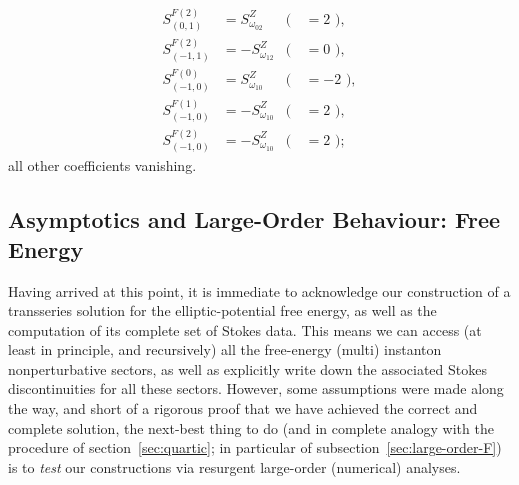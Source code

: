 \documentclass[11pt,a4paper]{article}
\begin{document}
%
\begin{align}
\label{ell-stokes-freeen-2-1}
S^{F(2)}_{(0,1)} &= S_{\omega_{02}}^Z &(\, &= 2\,\, ), \\
\label{ell-stokes-freeen-2-2}
S^{F(2)}_{(-1,1)} &= -S_{\omega_{12}}^Z &(\, &= 0\,\, ), \\
\label{ell-stokes-freeen-2-3}
S^{F(0)}_{(-1,0)} &= S_{\omega_{10}}^Z &(\, &= - 2\,\, ), \\
\label{ell-stokes-freeen-2-4}
S^{F(1)}_{(-1,0)} &= - S_{\omega_{10}}^Z &(\, &= 2\,\, ), \\
\label{ell-stokes-freeen-2-5}
S^{F(2)}_{(-1,0)} &= - S_{\omega_{10}}^Z &(\, &= 2\,\, );
\end{align}
%
\noindent
all other coefficients vanishing.

\subsection{Asymptotics and Large-Order Behaviour: Free Energy}\label{sec:large-order-nonres}

Having arrived at this point, it is immediate to acknowledge our construction of a transseries solution for the elliptic-potential free energy, as well as the computation of its complete set of Stokes data. This means we can access (at least in principle, and recursively) all the free-energy (multi) instanton nonperturbative sectors, as well as explicitly write down the associated Stokes discontinuities for all these sectors. However, some assumptions were made along the way, and short of a rigorous proof that we have achieved the correct and complete solution, the next-best thing to do (and in complete analogy with the procedure of section~\ref{sec:quartic}; in particular of subsection~\ref{sec:large-order-F}) is to \textit{test} our constructions via resurgent large-order (numerical) analyses.
\end{document}
